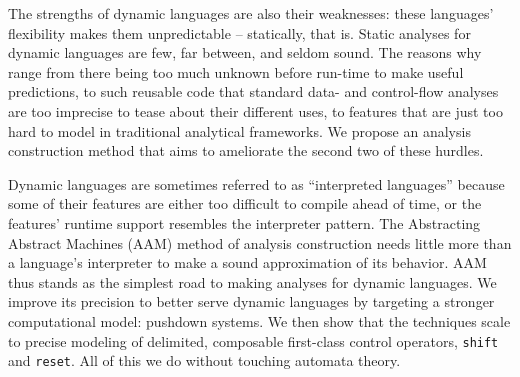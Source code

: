 The strengths of dynamic languages are also their weaknesses: these languages' flexibility makes them unpredictable -- statically, that is.
%
Static analyses for dynamic languages are few, far between, and seldom sound.
%
The reasons why range from there being too much unknown before run-time to make useful predictions, to such reusable code that standard data- and control-flow analyses are too imprecise to tease about their different uses, to features that are just too hard to model in traditional analytical frameworks.
%
We propose an analysis construction method that aims to ameliorate the second two of these hurdles.
%

%
Dynamic languages are sometimes referred to as ``interpreted languages'' because some of their features are either too difficult to compile ahead of time, or the features' runtime support resembles the interpreter pattern.
%
The Abstracting Abstract Machines (AAM) method of analysis construction needs little more than a language's interpreter to make a sound approximation of its behavior.
%
AAM thus stands as the simplest road to making analyses for dynamic languages.
%
We improve its precision to better serve dynamic languages by targeting a stronger computational model: pushdown systems.
%
We then show that the techniques scale to precise modeling of delimited, composable first-class control operators, {\tt shift} and {\tt reset}.
%
All of this we do without touching automata theory.